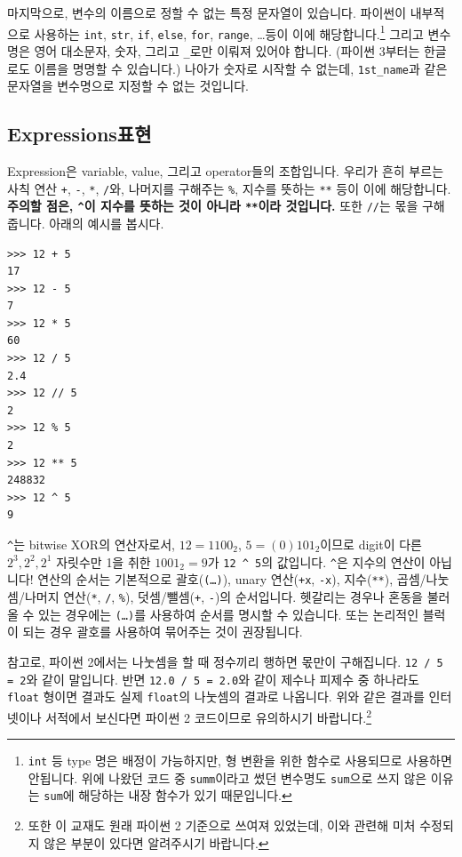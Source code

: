 \documentclass[../main.tex]{subfiles}
\begin{document}
마지막으로, 변수의 이름으로 정할 수 없는 특정 문자열이 있습니다.
파이썬이 내부적으로 사용하는 \texttt{int}, \texttt{str}, \texttt{if}, \texttt{else}, \texttt{for}, \texttt{range}, \dots 등이 이에 해당합니다.\footnote{\texttt{int} 등 type 명은 배정이 가능하지만, 형 변환을 위한 함수로 사용되므로 사용하면 안됩니다. 위에 나왔던 코드 중 \texttt{summ}이라고 썼던 변수명도 \texttt{sum}으로 쓰지 않은 이유는 \texttt{sum}에 해당하는 내장 함수가 있기 때문입니다.}
그리고 변수명은 영어 대소문자, 숫자, 그리고 \texttt{\_}로만 이뤄져 있어야 합니다.
(파이썬 3부터는 한글로도 이름을 명명할 수 있습니다.)
나아가 숫자로 시작할 수 없는데, \texttt{1st\_name}과 같은 문자열을 변수명으로 지정할 수 없는 것입니다.

\subsection{Expressions표현}
Expression은 variable, value, 그리고 operator들의 조합입니다.
우리가 흔히 부르는 사칙 연산 \texttt{+}, \texttt{-}, \texttt{*}, \texttt{/}와, 나머지를 구해주는 \texttt{\%}, 지수를 뜻하는 \texttt{**} 등이 이에 해당합니다.
\textbf{주의할 점은, \texttt{\^{}}이 지수를 뜻하는 것이 아니라 \texttt{**}이라 것입니다.}
또한 \texttt{//}는 몫을 구해줍니다.
아래의 예시를 봅시다.
\begin{verbatim}
>>> 12 + 5
17
>>> 12 - 5
7
>>> 12 * 5
60
>>> 12 / 5
2.4
>>> 12 // 5
2
>>> 12 % 5
2
>>> 12 ** 5
248832
>>> 12 ^ 5
9
\end{verbatim}
\texttt{\^{}}는 bitwise XOR의 연산자로서, $12 = 1100_2$, $5 = (0)101_2$이므로 digit이 다른 $2^3, 2^2, 2^1$ 자릿수만 1을 취한 $1001_2 = 9$가 \texttt{12 \^{} 5}의 값입니다.
\texttt{\^{}}은 지수의 연산이 아닙니다!
연산의 순서는 기본적으로 괄호(\texttt{(\dots)}), unary 연산(\texttt{+x}, \texttt{-x}), 지수(\texttt{**}), 곱셈/나눗셈/나머지 연산(\texttt{*}, \texttt{/}, \texttt{\%}), 덧셈/뺄셈(\texttt{+}, \texttt{-})의 순서입니다.
헷갈리는 경우나 혼동을 불러올 수 있는 경우에는 \texttt{(\dots)}를 사용하여 순서를 명시할 수 있습니다.
또는 논리적인 블럭이 되는 경우 괄호를 사용하여 묶어주는 것이 권장됩니다.

참고로, 파이썬 2에서는 나눗셈을 할 때 정수끼리 행하면 몫만이 구해집니다.
\texttt{12 / 5 = 2}와 같이 말입니다.
반면 \texttt{12.0 / 5 = 2.0}와 같이 제수나 피제수 중 하나라도 \texttt{float} 형이면 결과도 실제 \texttt{float}의 나눗셈의 결과로 나옵니다.
위와 같은 결과를 인터넷이나 서적에서 보신다면 파이썬 2 코드이므로 유의하시기 바랍니다.\footnote{또한 이 교재도 원래 파이썬 2 기준으로 쓰여져 있었는데, 이와 관련해 미처 수정되지 않은 부분이 있다면 알려주시기 바랍니다.}
\end{document}
